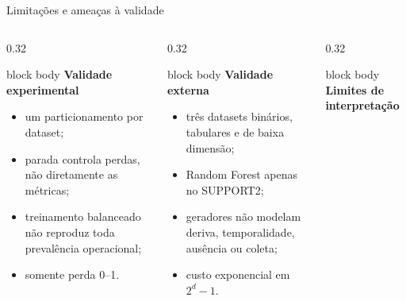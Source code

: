 \begin{frame}{Limitações e ameaças à validade}
  \fontsize{9.0}{10.7}\selectfont
  \begin{columns}[T,onlytextwidth]
    \begin{column}{0.32\textwidth}
      \begin{beamercolorbox}[wd=\linewidth,sep=.13cm,rounded=true]{block body}
        {\bfseries\color{CoInfoBlue}Validade experimental}\par\vspace{.08cm}
        \begin{itemize}\setlength{\itemsep}{.03cm}
          \item um particionamento por dataset;
          \item parada controla perdas, não diretamente as métricas;
          \item treinamento balanceado não reproduz toda prevalência operacional;
          \item somente perda 0--1.
        \end{itemize}
      \end{beamercolorbox}
    \end{column}
    \begin{column}{0.32\textwidth}
      \begin{beamercolorbox}[wd=\linewidth,sep=.13cm,rounded=true]{block body}
        {\bfseries\color{CoInfoBlue}Validade externa}\par\vspace{.08cm}
        \begin{itemize}\setlength{\itemsep}{.03cm}
          \item três datasets binários, tabulares e de baixa dimensão;
          \item Random Forest apenas no SUPPORT2;
          \item geradores não modelam deriva, temporalidade, ausência ou coleta;
          \item custo exponencial em $2^d-1$.
        \end{itemize}
      \end{beamercolorbox}
    \end{column}
    \begin{column}{0.32\textwidth}
      \begin{beamercolorbox}[wd=\linewidth,sep=.13cm,rounded=true]{block body}
        {\bfseries\color{CoInfoBlue}Limites de interpretação}\par\vspace{.08cm}

\end{beamercolorbox}
\end{column}
\end{columns}
\end{frame}
